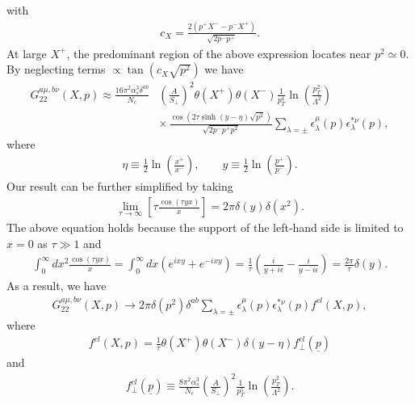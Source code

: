 \documentclass[onecolumn,showpacs,nobibnotes,nofootinbib,12pt,aps,prd,showpacs,notitlepage,nofootinbib,preprintnumbers,amsmath,amssymb]{article}
\begin{document}
with
\begin{align}
  c_X=\frac{2 \left(p^+ X^--p^- X^+\right)}{\sqrt{2 p^- p^+}}.
\end{align}
At large $X^+$, the predominant region of the above expression locates
near $p^2\simeq 0$. By neglecting terms $\propto\tan\left(c_X
  \sqrt{p^2}\right)$ we have
\begin{align}
  G_{22}^{a\mu,b\nu}(X, p)\approx\frac{16\pi^2\alpha_s^3\delta^{ab}}{N_c}&\left(\frac{A}{S_\perp}\right)^2\theta(X^+) \theta(X^-) \frac{1}{p_T^4}\ln\left(\frac{p_T^2}{\Lambda^2}\right)\nonumber\\
  & \times \, \frac{\cos \left(2 \tau\sinh(y-\eta)
      \sqrt{p^2}\right)}{\sqrt{2 p^- p^+
      p^2}}\sum\limits_{\lambda=\pm}\epsilon_\lambda^\mu(p)
  \epsilon_{\lambda}^{*\nu}(p),
\end{align}
where
\begin{align}\label{eq:rapidity}
  \eta\equiv\frac{1}{2}\ln\left(\frac{x^+}{x^-}\right),\qquad
  y\equiv\frac{1}{2}\ln\left(\frac{p^+}{p^-}\right).
\end{align}
Our result can be further simplified by taking
\begin{align}
  \lim\limits_{\tau\to \infty} \left[ \tau\frac{\cos(\tau y x)}{x}
  \right] = 2 \pi \delta(y)\delta(x^2).\label{eq:dd}
\end{align}
The above equation holds because the support of the left-hand side is
limited to $x=0$ as $\tau\gg 1$ and
\begin{align}
  \int_0^\infty dx^2 \frac{\cos(\tau y x)}{x}= \int_0^\infty dx
  \left(e^{i xy}+e^{-i
      xy}\right)=\frac{1}{\tau}\left(\frac{i}{y+i\epsilon}-\frac{i}{y-i\epsilon}\right)=
  \frac{2\pi}{\tau}\delta(y).
\end{align}
As a result, we have
\begin{align}\label{eq:G22cl}
  G_{22}^{a\mu,b\nu}(X, p)\to 2\pi\delta(p^2) \delta^{ab}
  \sum\limits_{\lambda=\pm}\epsilon_\lambda^\mu(p)
  \epsilon_{\lambda}^{*\nu}(p) f^{cl}(X,p),
\end{align}
where
\begin{align}
  f^{cl}(X,p)=\frac{1}{\tau} \theta(X^+) \theta(X^-) \delta(y-\eta)
  f_\perp^{cl}(\underline{p})
  \label{eq:fcl}
\end{align}
 and
\begin{align}
  f_\perp^{cl}(\underline{p})\equiv\frac{8\pi^2\alpha_s^3}{N_c}\left(\frac{A}{S_\perp}\right)^2
  \frac{1}{p_T^5}\ln\left(\frac{p_T^2}{\Lambda^2}\right).
\end{align}
\end{document}
